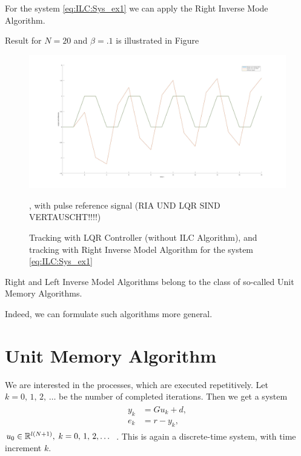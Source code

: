 \begin{exam}
	For the system \eqref{eq:ILC:Sys_ex1} we can apply the Right Inverse Mode Algorithm. 
	
	Result for $N = 20$ and $\beta = .1$ is illustrated in Figure  
	
	\begin{figure}[ht]
		\label{img:ILC:RIA}
		\includegraphics[width=\textwidth]{fig/RIA.jpg}
		\caption{Tracking with LQR Controller (without ILC Algorithm), and tracking with Right Inverse Model Algorithm for the system \eqref{eq:ILC:Sys_ex1}}, with pulse reference signal (RIA UND LQR SIND VERTAUSCHT!!!!) %
	\end{figure}
	
	
\end{exam}

Right and Left Inverse Model Algorithms belong to the class of so-called Unit Memory Algorithms. 

Indeed, we can formulate such algorithms more general. 

\section{Unit Memory Algorithm}

We are interested in  the processes, which are executed repetitively. Let $k = 0, \, 1, \, 2, \, \dots $ be the number of completed iterations. Then we get a system 
\begin{align}
\label{eq:unitMemory}
\begin{split}
y_{k} &= G u_k + d,  \\ %
e_k &= r - y_k, 
\end{split}
\end{align}
$u_{0} \in {\mathbb{R}}^{l(N+1)},  \; k =0, \,  1, \, 2, \dots $ .
This is again a discrete-time system, with time increment $k$. 

